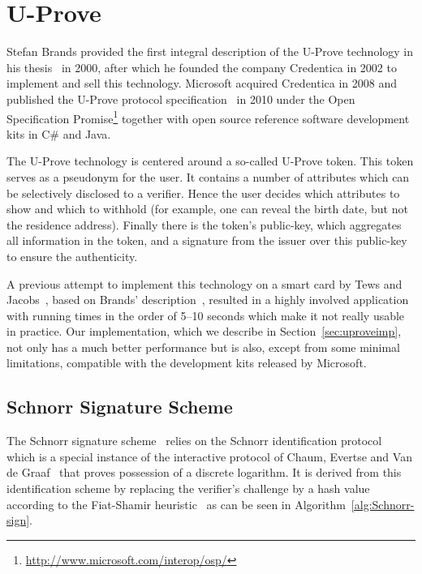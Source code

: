 \chapter{U-Prove}

Stefan Brands provided the first integral description of the U-Prove technology
in his thesis~\cite{Brands2000} in 2000, after which he founded the company
Credentica in 2002 to implement and sell this technology. Microsoft acquired
Credentica in 2008 and published the U-Prove protocol
specification~\cite{U-Prove_Crypto2013} in 2010 under the Open Specification
Promise\footnote{\url{http://www.microsoft.com/interop/osp/}} together with
open source reference software development kits in C\# and Java.

The U-Prove technology is centered around a so-called U-Prove token. This token
serves as a pseudonym for the user. It contains a number of attributes which can
be selectively disclosed to a verifier. Hence the user decides which attributes
to show and which to withhold (for example, one can reveal the birth date, but
not the residence address). Finally there is the token's public-key, which
aggregates all information in the token, and a signature from the issuer over
this public-key to ensure the authenticity.

A previous attempt to implement this technology on a smart card by Tews and
Jacobs~\cite{TewsJacobs09}, based on Brands' description~\cite{Brands2000},
resulted in a highly involved application with running times in the order of
5--10 seconds which make it not really usable in practice. Our implementation,
which we describe in Section~\ref{sec:uproveimp}, not only has a much better
performance but is also, except from some minimal limitations, compatible with
the development kits released by Microsoft.

\section{Schnorr Signature Scheme}

The Schnorr signature scheme~\cite{Schnorr1989,Schnorr1991} relies on the
Schnorr identification protocol~\cite{Schnorr1989} which is a special instance
of the interactive protocol of Chaum, Evertse and Van de
Graaf~\cite{ChaumEvdG1988} that proves possession of a discrete logarithm.
It is derived from this identification scheme by replacing the verifier's
challenge by a hash value according to the Fiat-Shamir
heuristic~\cite{FiatShamir1987} as can be seen in Algorithm~\ref{alg:Schnorr-sign}.

